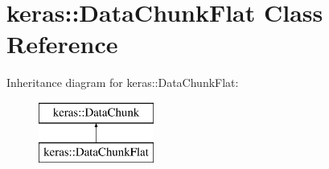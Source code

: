 \hypertarget{classkeras_1_1_data_chunk_flat}{}\section{keras\+:\+:Data\+Chunk\+Flat Class Reference}
\label{classkeras_1_1_data_chunk_flat}
Inheritance diagram for keras\+:\+:Data\+Chunk\+Flat\+:\begin{figure}[H]
\begin{center}
\leavevmode
\includegraphics[height=2.000000cm]{classkeras_1_1_data_chunk_flat}
\end{center}
\end{figure}
